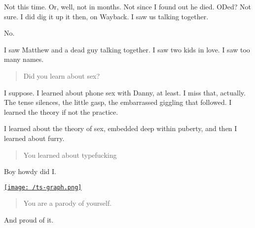 Not this time. Or, well, not in months. Not since I found out he died. ODed? Not sure. I did dig it up it then, on Wayback. I saw us talking together.

No.

I saw Matthew and a dead guy talking together. I saw two kids in love. I saw too many names.

\begin{quote}
Did you learn about sex?
\end{quote}

I suppose. I learned about phone sex with Danny, at least. I miss that, actually. The tense silences, the little gasp, the embarrassed giggling that followed. I learned the theory if not the practice.

I learned about the theory of sex, embedded deep within puberty, and then I learned about furry.

\begin{quote}
You learned about typefucking
\end{quote}

Boy howdy did I.

\href{/ts-graph.png}{\texttt{[image: /ts-graph.png]}}

\begin{quote}
You are a parody of yourself.
\end{quote}

And proud of it.
